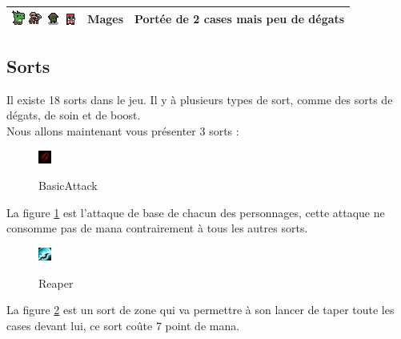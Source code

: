 \documentclass[a4paper, 12pt]{article}
\begin{document}
\begin{center}
\begin{tabular}{ | c | c | c | }
    \hline
    \includegraphics[scale=2]{./monsters/Lizard}
    \includegraphics[scale=1.5]{./monsters/SkeletonMagus} 
    \includegraphics[scale=1.5]{./monsters/Goblin}
    \includegraphics[scale=2]{./monsters/Shaman} & Mages & Portée de 2 cases mais peu de dégats\\
	\hline
\end{tabular}
\end{center}
\subsection*{Sorts}
Il existe 18 sorts dans le jeu. Il y à plusieurs types de sort, comme des sorts de dégats, de soin et de boost. \\
Nous allons maintenant vous présenter 3 sorts : 

\begin{figure}[h]
\center
\includegraphics[scale=2]{./Spell/Basic1}\\
\caption{BasicAttack}
\label{fig:BasicAttack}
\end{figure}

La figure \ref{fig:BasicAttack} est l'attaque de base de chacun des personnages, cette attaque ne consomme pas de mana contrairement à tous les autres sorts.

\begin{figure}[h]
\begin{center}
\includegraphics[scale=2]{./Spell/Reaper1}\\
\caption{Reaper}
\label{fig:Reaper}
\end{center}
\end{figure}


La figure \ref{fig:Reaper} est un sort de zone qui va permettre à son lancer de taper toute les cases devant lui, ce sort coûte 7 point de mana.\\
\end{document}
